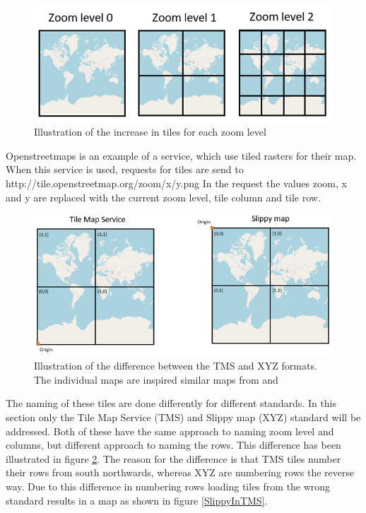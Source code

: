\begin{figure} [H]
	\centering
	\includegraphics[width=.8\textwidth]{Pictures/TilesPerZoomLevel}
	\caption{Illustration of the increase in tiles for each zoom level}
	\label{TilesPerZoomLevel}
\end{figure}

Openstreetmaps is an example of a service, which use tiled rasters for their map. When this service is used, requests for tiles are send to 
http://tile.openstreetmap.org/zoom/x/y.png
In the request the values zoom, x and y are replaced with the current zoom level, tile column and tile row.
\citep{SlippyMap}

\begin{figure} [H]
	\centering
	\includegraphics[width=.8\textwidth]{Pictures/TMSXYZ}
	\caption{Illustration of the difference between the TMS and XYZ formats. The individual maps are inspired similar maps from \citet{Slippy101} and \citet{TMSnaming}}
	\label{TMSXYZ}
\end{figure}

% 

The naming of these tiles are done differently for different standards. In this section only the Tile Map Service (TMS) and Slippy map (XYZ) standard will be addressed. Both of these have the same approach to naming zoom level and columns, but different approach to naming the rows. This difference has been illustrated in figure \ref{TMSXYZ}. The reason for the difference is that TMS tiles number their rows from south northwards, whereas XYZ are numbering rows the reverse way. Due to this difference in numbering rows loading tiles from the wrong standard results in a map as shown in figure \ref{SlippyInTMS}.
\citep{TMS}


